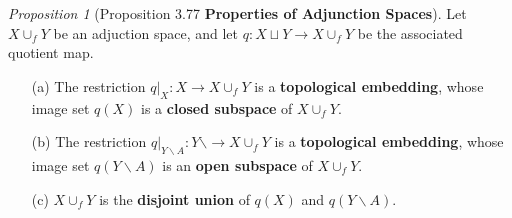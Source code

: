 \documentclass[a4paper]{article}
\theoremstyle{remark}
\newtheorem{prop}{Proposition}
\begin{document}
\begin{prop}[Proposition 3.77 \textbf{Properties of Adjunction Spaces}]
	Let $X \cup_f Y$ be an adjuction space, and let $q: X \sqcup Y \to X \cup_f Y$ be the associated quotient map.
	\begin{enumerate}[nolistsep]
		\item[(a)] The restriction $ q|_X : X \to X \cup_f Y$ is a \textbf{topological embedding}, whose image set $q(X)$ is a \textbf{closed subspace} of $X \cup_f Y$.
		\item [(b)] The restriction $q|_{Y \smallsetminus A} : Y \smallsetminus \to X \cup_f Y$ is a \textbf{topological embedding}, whose image set $q(Y \smallsetminus A)$ is an \textbf{open subspace} of $X \cup_f Y$.
		\item [(c)] $X \cup_f Y$ is the \textbf{disjoint union} of $q(X)$ and $q(Y \smallsetminus A)$. 
	\end{enumerate}
\end{prop}
\end{document}
